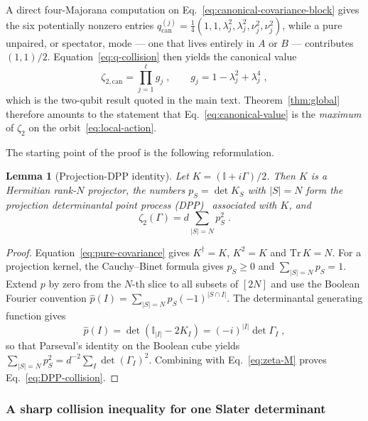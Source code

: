 \documentclass[prx,twocolumn,superscriptaddress,aps,10pt, frontmatterverbose, reprint,footinbib,longbibliography=true]{revtex4-2}
\newtheorem{lemma}{Lemma}
\begin{document}
A direct four-Majorana computation on Eq.~\eqref{eq:canonical-covariance-block} gives the six potentially nonzero entries $q^{(j)}_{\mathrm{can}}=\tfrac14(1,1,\lambda_j^2,\lambda_j^2,\nu_j^2,\nu_j^2)$, while a pure unpaired, or spectator, mode --- one that lives entirely in $A$ or $B$ --- contributes $(1,1)/2$. Equation~\eqref{eq:q-collision} then yields the canonical value
\begin{equation}
    \zeta_{2,\mathrm{can}}=\prod_{j=1}^{\ell}g_j\;,\qquad g_j=1-\lambda_j^2+\lambda_j^4\;,
    \label{eq:canonical-value}
\end{equation}
which is the two-qubit result quoted in the main text. Theorem~\ref{thm:global} therefore amounts to the statement that Eq.~\eqref{eq:canonical-value} is the \emph{maximum} of $\zeta_2$ on the orbit~\eqref{eq:local-action}.

The starting point of the proof is the following reformulation.

\begin{lemma}[Projection-DPP identity]
\label{lem:DPP}
Let $K=(\mathbb{I}+i\Gamma)/2$. Then $K$ is a Hermitian rank-$N$ projector, the numbers $p_S=\det K_S$ with $|S|=N$ form the projection determinantal point process (DPP)~\cite{collura2026nonstabilizernessfermionicgaussianstates} associated with $K$, and
\begin{equation}
    \zeta_2(\Gamma)=d\sum_{|S|=N}p_S^2\;.
    \label{eq:DPP-collision}
\end{equation}
\end{lemma}

\begin{proof}
Equation~\eqref{eq:pure-covariance} gives $K^\dagger=K$, $K^2=K$ and $\mathrm{Tr}\,K=N$. For a projection kernel, the Cauchy--Binet formula gives $p_S\ge0$ and $\sum_{|S|=N}p_S=1$. Extend $p$ by zero from the $N$-th slice to all subsets of $[2N]$ and use the Boolean Fourier convention $\widehat p(I)=\sum_{|S|=N}p_S(-1)^{|S\cap I|}$. The determinantal generating function gives
\begin{equation}
    \widehat p(I)=\det(\mathbb{I}_{|I|}-2K_I)=(-i)^{|I|}\det\Gamma_I\;,
\end{equation}
so that Parseval's identity on the Boolean cube yields $\sum_{|S|=N}p_S^2=d^{-2}\sum_I\det(\Gamma_I)^2$. Combining with Eq.~\eqref{eq:zeta-M} proves Eq.~\eqref{eq:DPP-collision}.
\end{proof}



\subsubsection{A sharp collision inequality for one Slater determinant}
\label{app:proof:slater}
\end{document}
